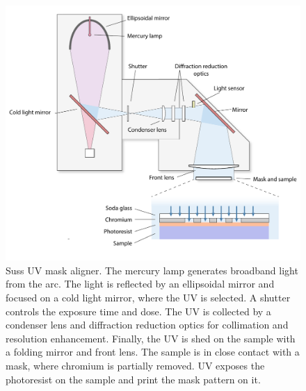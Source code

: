 \documentclass[pdflatex, sectionletters, 12pt]{pittetd}    %
\begin{document}
\begin{figure}[hp!]
	\centering
	\includegraphics[width=1.0\textwidth]{Drawing/Suss.pdf}
	\caption{Suss UV mask aligner. The mercury lamp generates broadband light from the arc. The light is reflected by an ellipsoidal mirror and focused on a cold light mirror, where the UV is selected. A shutter controls the exposure time and dose. The UV is collected by a condenser lens and diffraction reduction optics for collimation and resolution enhancement. Finally, the UV is shed on the sample with a folding mirror and front lens. The sample is in close contact with a mask, where chromium is partially removed. UV exposes the photoresist on the sample and print the mask pattern on it.}
	\label{FIG:Suss}
\end{figure}
\end{document}
